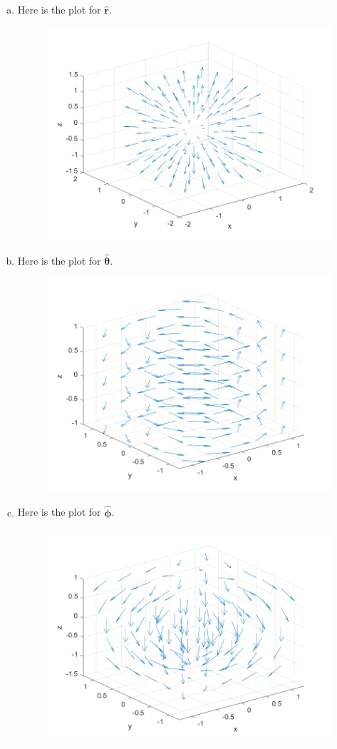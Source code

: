 \documentclass[12pt]{article} %
\newcommand{\rhat}{\boldsymbol{\hat{r}}}
\newcommand{\thetahat}{\boldsymbol{\hat{\theta}}}
\newcommand{\phihat}{\boldsymbol{\hat{\phi}}}
\begin{document}
\begin{solution}
~
\begin{enumerate}[(a)]
    \item Here is the plot for $\rhat$.
    \begin{figure}[H]
        \centering
        \includegraphics[width=.8\textwidth]{r_hat.png}
    \end{figure}
        \item Here is the plot for $\thetahat$.
        \begin{figure}[H]
            \centering
            \includegraphics[width=.8\textwidth]{theta_hat.png}
        \end{figure}
    \item Here is the plot for $\phihat$.
    \begin{figure}[H]
        \centering
        \includegraphics[width=.8\textwidth]{phi_hat.png}

\end{figure}
\end{enumerate}
\end{solution}
\end{document}

